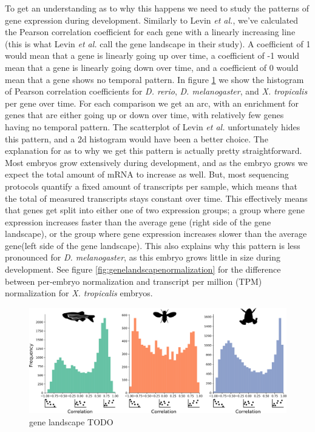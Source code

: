 To get an understanding as to why this happens we need to study the patterns of gene expression during development. Similarly to Levin \textit{et al.}, we've calculated the Pearson correlation coefficient for each gene with a linearly increasing line (this is what Levin \textit{et al.} call the gene landscape in their study). A coefficient of 1 would mean that a gene is linearly going up over time, a coefficient of -1 would mean that a gene is linearly going down over time, and a coefficient of 0 would mean that a gene shows no temporal pattern. In figure \ref{fig:genelandscape} we show the histogram of Pearson correlation coefficients for \textit{D. rerio}, \textit{D. melanogaster}, and \textit{X. tropicalis} per gene over time. For each comparison we get an arc, with an enrichment for genes that are either going up or down over time, with relatively few genes having no temporal pattern. The scatterplot of Levin \textit{et al.} unfortunately hides this pattern, and a 2d histogram would have been a better choice. The explanation for as to why we get this pattern is actually pretty straightforward. Most embryos grow extensively during development, and as the embryo grows we expect the total amount of mRNA to increase as well. But, most sequencing protocols quantify a fixed amount of transcripts per sample, which means that the total of measured transcripts stays constant over time. This effectively means that genes get split into either one of two expression groups; a group where gene expression increases faster than the average gene (right side of the gene landscape), or the group where gene expression increases slower than the average gene(left side of the gene landscape). This also explains why this pattern is less pronounced for \textit{D. melanogaster}, as this embryo grows little in size during development. See figure \ref{fig:genelandscapenormalization} for the difference between per-embryo normalization and transcript per million (TPM) normalization for \textit{X. tropicalis} embryos.  

\begin{figure}[H]
    \includegraphics[width=\linewidth]{ch4.hourglass/images/gene_landscape.png}
    \caption{gene landscape TODO}
    \label{fig:genelandscape}
\end{figure}

